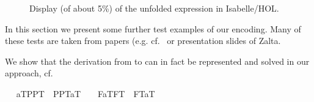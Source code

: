 \begin{isabellebody}
\begin{isamarkuptext}
\begin{figure}[t]
  \caption{Display (of about 5\%) of the unfolded 
  expression  
 in Isabelle/HOL. \label{large}} 
  \end{figure}%
\end{isamarkuptext}\isamarkuptrue%
%
\isamarkuptrue%
%
\begin{isamarkuptext}%
In this section we present some further test examples of our encoding. Many of these tests are taken
 from papers (e.g. cf.~\cite{zalta11:_relat_versus_funct_found_logic} or presentation slides of Zalta.%
\end{isamarkuptext}\isamarkuptrue%
%
\begin{isamarkuptext}%
We show that the derivation from  
to  can in fact be 
represented and solved in our approach, 
cf. ~\cite[chap.4]{zalta11:_relat_versus_funct_found_logic}%
\end{isamarkuptext}\isamarkuptrue%
\ \isamarkupfalse%
\ {\isachardoublequoteopen}{\isacharbrackleft}{\isacharparenleft}{\isasymlbrace}a\isactrlsup T{\isacharcomma}PP\isactrlsup T{\isasymrbrace}\ \isactrlbold {\isasymand}\ \isactrlbold {\isasymnot}{\isasymlparr}PP\isactrlsup T{\isacharcomma}a\isactrlsup T{\isasymrparr}{\isacharparenright}{\isacharbrackright}\ {\isacharequal}\ {\isasymtop}\ {\isasymlongrightarrow}\ {\isacharbrackleft}{\isacharparenleft}\isactrlbold {\isasymexists}F{\isachardot}{\isasymlbrace}a\isactrlsup T{\isacharcomma}F\isactrlsup T{\isasymrbrace}\ \isactrlbold {\isasymand}\ \isactrlbold {\isasymnot}{\isasymlparr}F\isactrlsup T{\isacharcomma}a\isactrlsup T{\isasymrparr}{\isacharparenright}{\isacharbrackright}\ {\isacharequal}\ {\isasymtop}{\isachardoublequoteclose}%

\end{isabellebody}
